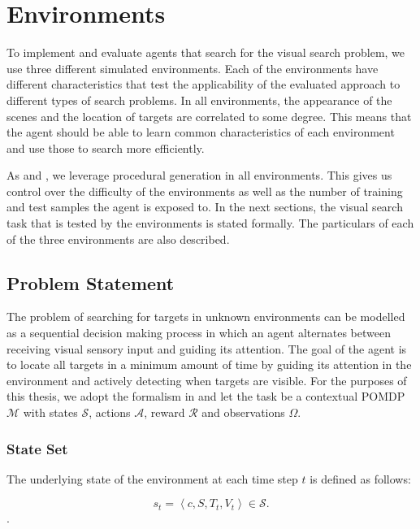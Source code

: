 \section{Environments}
\label{sec:environments}

To implement and evaluate agents that search for the visual search problem, we use three different simulated environments.
Each of the environments have different characteristics that test the applicability of the evaluated approach to different types of search problems.
In all environments, the appearance of the scenes and the location of targets are correlated to some degree.
This means that the agent should be able to learn common characteristics of each environment and use those to search more efficiently.

As \cite{cobbe_leveraging_2020} and \cite{mnih_asynchronous_2016}, we leverage procedural generation in all environments.
This gives us control over the difficulty of the environments as well as the number of training and test samples the agent is exposed to.
In the next sections, the visual search task that is tested by the environments is stated formally.
The particulars of each of the three environments are also described.

\subsection{Problem Statement}

The problem of searching for targets in unknown environments can be modelled as a sequential decision making process in which an agent alternates between receiving visual sensory input and guiding its attention.
The goal of the agent is to locate all targets in a minimum amount of time by guiding its attention in the environment and actively detecting when targets are visible.
For the purposes of this thesis, we adopt the formalism in \cite{kirk_survey_2022} and let the task be a contextual POMDP \(\mathcal{M}\) with states \(\mathcal{S}\), actions \(\mathcal{A}\), reward \(\mathcal{R}\) and observations \(\Omega\).

\subsubsection{State Set}

The underlying state of the environment at each time step \(t\) is defined as follows:

\begin{equation}
    s_t = \left\langle c, S, T_t, V_t \right\rangle \in \mathcal{S}.
\end{equation}.


